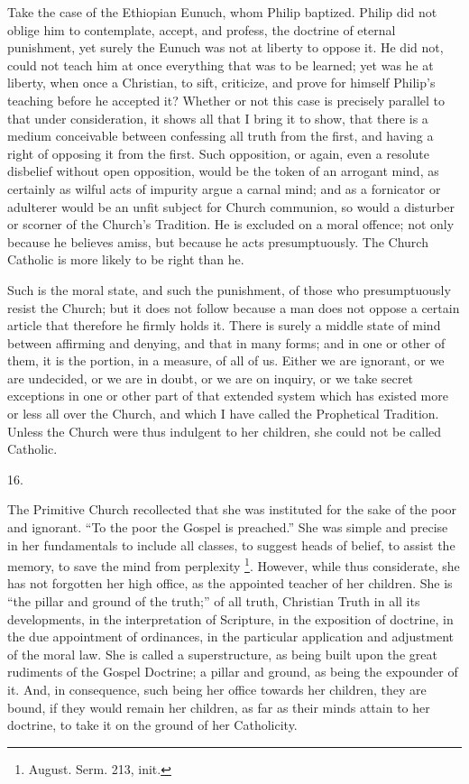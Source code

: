 Take the case of the Ethiopian Eunuch, whom Philip baptized. Philip
did not oblige him to contemplate, accept, and profess, the doctrine
of eternal punishment, yet surely the Eunuch was not at liberty to
oppose it. He did not, could not teach him at once everything that was
to be learned; yet was he at liberty, when once a Christian, to sift,
criticize, and prove for himself Philip's teaching before he accepted
it? Whether or not this case is precisely parallel to that under
consideration, it shows all that I bring it to show, that there is a
medium conceivable between confessing all truth from the first, and
having a right of opposing it from the first. Such opposition, or
again, even a resolute disbelief without open opposition, would be the
token of an arrogant mind, as certainly as wilful acts of impurity
argue a carnal mind; and as a fornicator or adulterer would be an
unfit subject for Church communion, so would a disturber or scorner of
the Church's Tradition. He is excluded on a moral offence; not only
because he believes amiss, but because he acts presumptuously.
The Church Catholic is more likely to be right than he.

Such is the moral state, and such the punishment, of those who
presumptuously resist the Church; but it does not follow because a man
does not oppose a certain article that therefore he firmly holds it.
There is surely a middle state of mind between affirming and denying,
and that in many forms; and in one or other of them, it is the
portion, in a measure, of all of us. Either we are ignorant, or we are
undecided, or we are in doubt, or we are on inquiry, or we take secret
exceptions in one or other part of that extended system which has
existed more or less all over the Church, and which I have called the
Prophetical Tradition. Unless the Church were thus indulgent to her
children, she could not be called Catholic.

16.

The Primitive Church recollected that she was instituted for the
sake of the poor and ignorant. ``To the poor the Gospel is
preached.'' She was simple and precise in her fundamentals to
include all classes, to suggest heads of belief, to assist the memory,
to save the mind from perplexity \footnote{August. Serm. 213, init.}. However, while thus considerate, she has not forgotten her
high office, as the appointed teacher of her children. She is
``the pillar and ground of the truth;'' of all truth,
Christian Truth in all its developments, in the interpretation of
Scripture, in the exposition of doctrine, in the due appointment of
ordinances, in the particular application and adjustment of the moral
law. She is called a superstructure, as being built upon the great
rudiments of the Gospel Doctrine; a pillar and ground, as being the
expounder of it. And, in consequence, such being her office towards
her children, they are bound, if they would remain her children, as
far as their minds attain to her doctrine, to take it on the
ground of her Catholicity.

